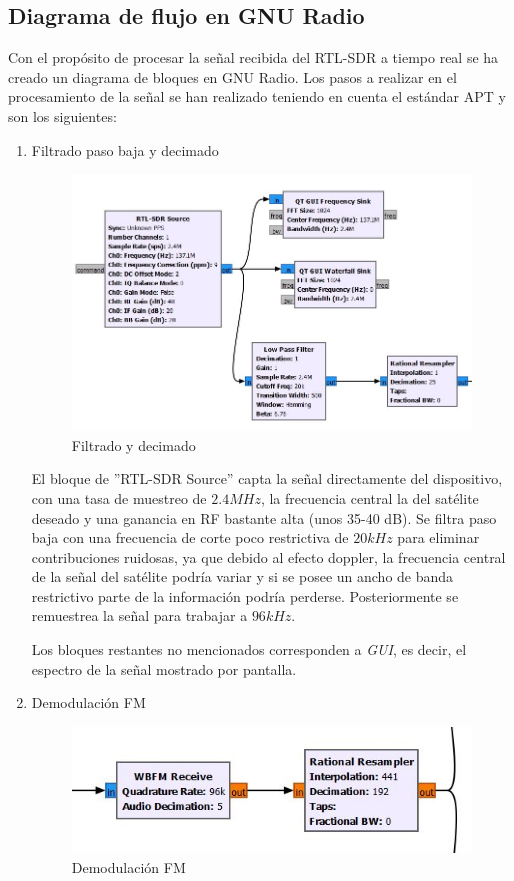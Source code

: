 \documentclass[a4paper,openright,12pt]{article}
\begin{document}
	\subsection{Diagrama de flujo en GNU Radio}
	Con el propósito de procesar la señal recibida del RTL-SDR a tiempo real se ha creado un diagrama de bloques en GNU Radio. Los pasos a realizar en el procesamiento de la señal se han realizado teniendo en cuenta el estándar APT y son los siguientes:
	\begin{enumerate}
	\item Filtrado paso baja y decimado
	
		\begin{figure}[hbtp]
 \centering
 \includegraphics[width = 12cm]{imagenes/primer_paso.JPG}
 \caption{Filtrado y decimado}
 \label{filtardo_decimado}
 \end{figure}
 
 El bloque de ''RTL-SDR Source'' capta la señal directamente del dispositivo, con una tasa de muestreo de $2.4 MHz$, la frecuencia central la del satélite deseado y una ganancia en RF bastante alta (unos 35-40 dB).
 Se filtra paso baja con una frecuencia de corte poco restrictiva de $20 kHz$ para eliminar contribuciones ruidosas, ya que debido al efecto doppler, la frecuencia central de la señal del satélite podría variar y si se posee un ancho de banda restrictivo parte de la información podría perderse. Posteriormente se remuestrea la señal para trabajar a $96 kHz$.

Los bloques restantes no mencionados corresponden a \textit{GUI}, es decir, el espectro de la señal mostrado por pantalla.
 
 
 
	\item Demodulación FM
	
		\begin{figure}[hbtp]
 \centering
 \includegraphics[width = 12cm]{imagenes/wbfm.JPG}
 \caption{Demodulación FM}
 \label{wbfm}
 \end{figure}
 

\end{enumerate}
\end{document}

